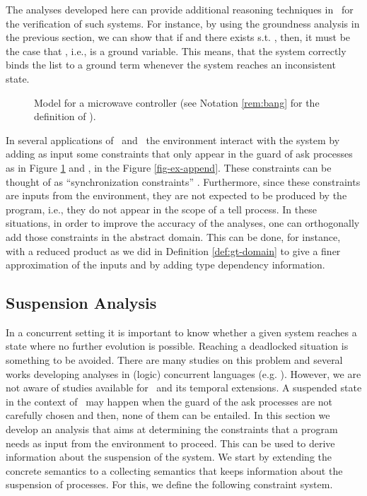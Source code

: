 \documentclass{tlp}
\begin{document}
The analyses developed here  can provide additional reasoning techniques in \tccp\ for the verification of  such systems. For instance, by using the groundness analysis   in the previous section, we can show that if    and there exists  s.t. , then, it must be the case that  , i.e.,  is  a ground variable. This means, that the system correctly binds the list  to a ground term whenever the system reaches an inconsistent state. 



\begin{figure}[t]

\caption{Model for a microwave controller (see Notation  \ref{rem:bang} for the definition of ).  \label{fig:micro} }
\end{figure}

\begin{observation}
 In several  applications of \tccp\ and \utcc\  the environment interact with the system by adding as input some constraints that only appear in the guard of ask processes as    in Figure \ref{fig:micro} and 
,   in the Figure \ref{fig-ex-append}. These constraints can be thought of as ``synchronization constraints''  \cite{DBLP:journals/iandc/FagesRS01}. Furthermore, since these constraints are inputs from the environment, they are not expected to be produced by the program, i.e., they do not appear in the scope of a tell process. In these situations, in order to improve the accuracy of the analyses, one can orthogonally add  those constraints in the abstract domain. This can be done,  for instance,  with a reduced product as we did in Definition \ref{def:gt-domain} to  give a finer approximation of the inputs  and  by adding type dependency information.
\end{observation}






\subsection{Suspension Analysis}
In a concurrent setting it is important to know whether  a given system 
reaches a state where no further evolution is possible. 
Reaching a deadlocked situation is something to be avoided. There are many studies on this problem and 
several works developing analyses in (logic) concurrent languages
(e.g. \cite{CFM94,CFMW97}). However, we are not aware of studies 
available for \ccp\ and its temporal extensions. A  suspended state in the context of 
\ccp\  may happen when the guard of the ask processes  are not carefully chosen and then, none of them can be entailed. In this section we develop an analysis  that 
aims at determining the  constraints that a program needs as input from 
the environment to proceed. This can be used to derive information about 
the suspension of the system. We start by   extending  the concrete semantics to a 
collecting semantics that keeps information about the suspension of processes. 
For this, we define  the following constraint system. 
\end{document}
